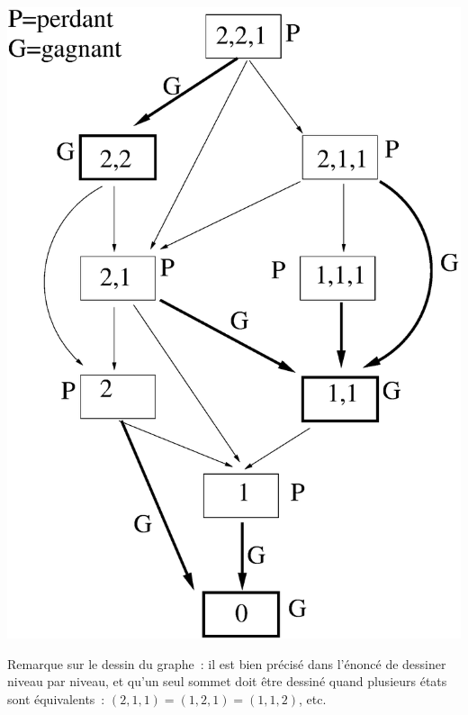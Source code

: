 \documentclass[11pt]{article}
\begin{document}
\bigskip

\begin{center}
\includegraphics[width=0.75\linewidth]{nim.eps}
\end{center}
Remarque sur le dessin du graphe~: il est bien précisé dans l'énoncé de dessiner niveau par niveau, et qu'un seul sommet doit être dessiné quand plusieurs états sont équivalents~: $(2,1,1)=(1,2,1)=(1,1,2)$, etc.
\end{document}
